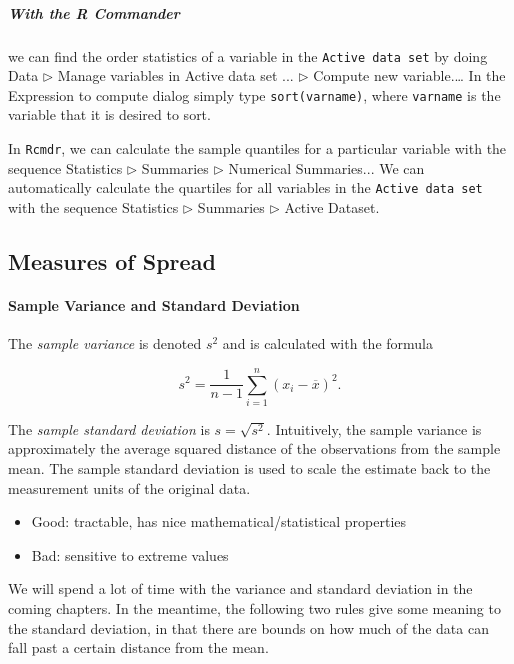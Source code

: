\documentclass[captions=tableheading]{scrbook}
\begin{document}
\subparagraph*{With the \textsf{R} Commander}
we can find the order statistics of a variable in the \texttt{Active data set} by doing \textsf{Data \(\triangleright\) Manage variables in Active data set ... \(\triangleright\) Compute new variable}.\ldots{} In the \textsf{Expression to compute} dialog simply type \texttt{sort(varname)}, where \texttt{varname} is the variable that it is desired to sort.

In \texttt{Rcmdr}, we can calculate the sample quantiles for a particular variable with the sequence \textsf{Statistics \(\triangleright\) Summaries \(\triangleright\) Numerical Summaries}... We can automatically calculate the quartiles for all variables in the \texttt{Active data set} with the sequence \textsf{Statistics \(\triangleright\) Summaries \(\triangleright\) Active Dataset}.
\subsection{Measures of Spread}
\label{sec-3-3-4}

\label{sub:Measures-of-Spread}

\paragraph*{Sample Variance and Standard Deviation}

The \emph{sample variance} is denoted \(s^{2}\) and is calculated with the formula

\begin{equation}
s^{2}=\frac{1}{n-1}\sum_{i=1}^{n}(x_{i}-\overline{x})^{2}.
\end{equation}

The \emph{sample standard deviation} is \(s=\sqrt{s^{2}}\). Intuitively, the sample variance is approximately the average squared distance of the observations from the sample mean. The sample standard deviation is used to scale the estimate back to the measurement units of the original data.

\begin{itemize}
\item Good: tractable, has nice mathematical/statistical properties
\item Bad: sensitive to extreme values
\end{itemize}

We will spend a lot of time with the variance and standard deviation in the coming chapters. In the meantime, the following two rules give some meaning to the standard deviation, in that there are bounds on how much of the data can fall past a certain distance from the mean.
\end{document}
